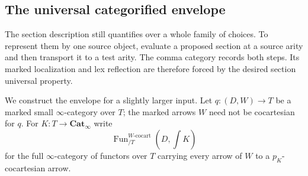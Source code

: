 \documentclass[oneside]{article}
\theoremstyle{plain}
\theoremstyle{definition}
\theoremstyle{remark}
\newcommand{\Cat}{\mathbf{Cat}_{\infty}}
\newcommand{\Fun}{\operatorname{Fun}}
\newcommand{\coc}{\mathrm{cocart}}
\begin{document}
\subsection{The universal categorified envelope}\label{sec:thz:envelope}

The section description still quantifies over a whole family of choices.
To represent them by one source object, evaluate a proposed section at a
source arity and then transport it to a test arity. The comma category
records both steps. Its marked localization and lex reflection are
therefore forced by the desired section universal property.

We construct the envelope for a slightly larger input.  Let
$q:(D,W)\to T$ be a marked small $\infty$-category over $T$; the marked
arrows $W$ need not be cocartesian for $q$.  For $K:T\to\Cat$ write
\[
 \Fun^{W\text{-}\coc}_{/T}
   (D,\textstyle\int K)
\]
for the full $\infty$-category of functors over $T$ carrying every arrow
of $W$ to a $p_K$-cocartesian arrow.
\end{document}
